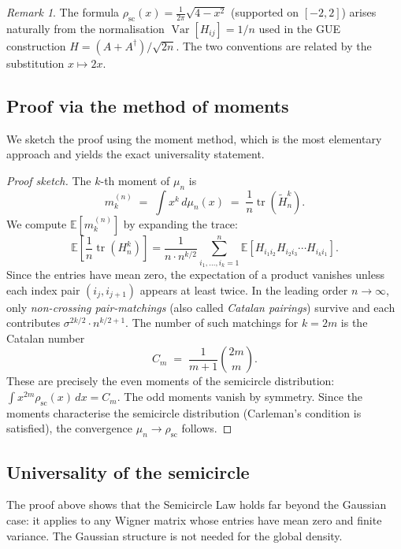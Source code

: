 \documentclass[12pt,a4paper]{amsart}
\theoremstyle{definition}
\theoremstyle{remark}
\newtheorem{remark}[theorem]{Remark}
\begin{document}
\begin{remark}
The formula $\rho_{\mathrm{sc}}(x) = \frac{1}{2\pi}\sqrt{4-x^2}$ (supported
on $[-2,2]$) arises naturally from the normalisation $\operatorname{Var}[H_{ij}] = 1/n$
used in the GUE construction $H = (A + A^\dagger)/\sqrt{2n}$.
The two conventions are related by the substitution $x \mapsto 2x$.
\end{remark}

\subsection{Proof via the method of moments}

We sketch the proof using the moment method, which is the most elementary
approach and yields the exact universality statement.

\begin{proof}[Proof sketch]
The $k$-th moment of $\mu_n$ is
\[
  m_k^{(n)} \;=\; \int x^k\,d\mu_n(x)
  \;=\; \frac{1}{n}\operatorname{tr}(\tilde{H}_n^k).
\]
We compute $\mathbb{E}[m_k^{(n)}]$ by expanding the trace:
\[
  \mathbb{E}\!\left[\frac{1}{n}\operatorname{tr}(H_n^k)\right]
  = \frac{1}{n \cdot n^{k/2}} \sum_{i_1,\ldots,i_k=1}^n
    \mathbb{E}[H_{i_1 i_2} H_{i_2 i_3} \cdots H_{i_k i_1}].
\]
Since the entries have mean zero, the expectation of a product vanishes unless
each index pair $(i_j, i_{j+1})$ appears at least twice. In the leading order
$n \to \infty$, only \emph{non-crossing pair-matchings} (also called
\emph{Catalan pairings}) survive and each contributes $\sigma^{2k/2} \cdot n^{k/2+1}$.
The number of such matchings for $k = 2m$ is the Catalan number
\[
  C_m \;=\; \frac{1}{m+1}\binom{2m}{m}.
\]
These are precisely the even moments of the semicircle distribution:
$\int x^{2m}\rho_{\mathrm{sc}}(x)\,dx = C_m$.
The odd moments vanish by symmetry. Since the moments characterise the
semicircle distribution (Carleman's condition is satisfied), the convergence
$\mu_n \to \rho_{\mathrm{sc}}$ follows.
\end{proof}

\subsection{Universality of the semicircle}

The proof above shows that the Semicircle Law holds far beyond the Gaussian
case: it applies to any Wigner matrix whose entries have mean zero and finite
variance. The Gaussian structure is not needed for the global density.
\end{document}
